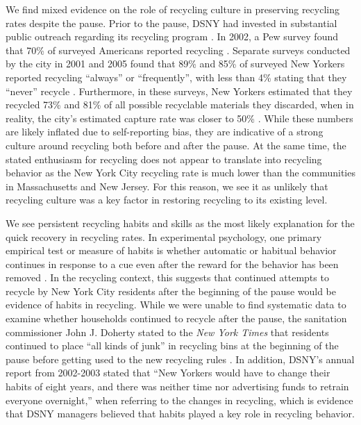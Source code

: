 \documentclass[12pt]{article}
\begin{document}
We find mixed evidence on the role of recycling culture in preserving recycling rates despite the pause.  Prior to the pause, DSNY had invested in substantial public outreach regarding its recycling program \citep{dsnyreports}.  In 2002, a Pew survey found that 70\% of surveyed Americans reported recycling \citep{pew2009}.  Separate surveys conducted by the city in 2001 and 2005 found that 89\% and 85\% of surveyed New Yorkers reported recycling ``always'' or ``frequently'', with less than 4\% stating that they ``never'' recycle \citep{lange2007}.  Furthermore, in these surveys, New Yorkers estimated that they recycled 73\% and 81\% of all possible recyclable materials they discarded, when in reality, the city's estimated capture rate was closer to 50\% \citep{dsnywcs2005}.  While these numbers are likely inflated due to self-reporting bias, they are indicative of a strong culture around recycling both before and after the pause.  At the same time, the stated enthusiasm for recycling does not appear to translate into recycling behavior as the New York City recycling rate is much lower than the communities in Massachusetts and New Jersey.  For this reason, we see it as unlikely that recycling culture was a key factor in restoring recycling to its existing level.

We see persistent recycling habits and skills as the most likely explanation for the quick recovery in recycling rates.  In experimental psychology, one primary empirical test or measure of habits is whether automatic or habitual behavior continues in response to a cue even after the reward for the behavior has been removed \citep{dickinson1985,woodrunger2016}.  In the recycling context, this suggests that continued attempts to recycle by New York City residents after the beginning of the pause would be evidence of habits in recycling.  While we were unable to find systematic data to examine whether households continued to recycle after the pause, the sanitation commissioner John J. Doherty stated to the \textit{New York Times} that residents continued to place ``all kinds of junk'' in recycling bins at the beginning of the pause before getting used to the new recycling rules \citep{nytcardwell2002}.  In addition, DSNY's annual report from 2002-2003 stated that ``New Yorkers would have to change their habits of eight years, and there was neither time nor
advertising funds to retrain everyone overnight,'' when referring to the changes in recycling, which is evidence that DSNY managers believed that habits played a key role in recycling behavior.
\end{document}
